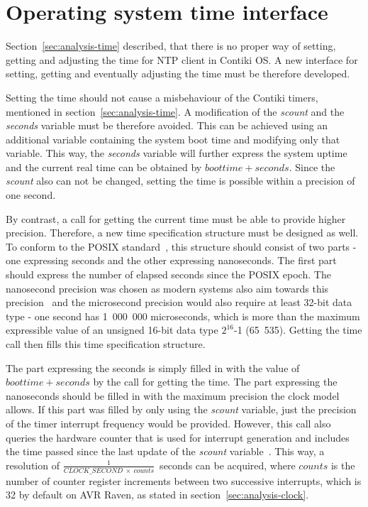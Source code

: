 
\section{Operating system time interface}\label{sec:analysis-interface}
Section~\ref{sec:analysis-time} described, that there is no proper
way of setting, getting and adjusting the time for NTP client in Contiki OS.
A new interface for setting, getting and eventually adjusting the time
must be therefore developed.

Setting the time should not cause a misbehaviour of the Contiki timers,
mentioned in section~\ref{sec:analysis-time}.
A modification of the {\it{scount}} and the {\it{seconds}} variable must be therefore avoided.
This can be achieved using an additional variable containing the system boot time
and modifying only that variable.
This way, the {\it{seconds}} variable will further express the system uptime
and the current real time can be obtained by $boottime + seconds$.
Since the {\it{scount}} also can not be changed, setting the time is possible
within a precision of one second.

By contrast, a call for getting the current time must be able to provide higher precision.
Therefore, a new time specification structure must be designed as well.
To conform to the POSIX standard~\cite{posix}, this structure should consist of two parts -
one expressing seconds and the other expressing nanoseconds.
The first part should express the number of elapsed seconds since the POSIX epoch.
The nanosecond precision was chosen as modern systems also aim towards this
precision~\cite{posix,ntp-precision} and
the microsecond precision would also require at least 32-bit data type -
one second has 1~000~000 microseconds, which is more than the maximum expressible value of
an unsigned 16-bit data type $2^{16}$-1 (65~535).
Getting the time call then fills this time specification structure.

The part expressing the seconds is simply filled in with the value of $boottime + seconds$
by the call for getting the time.
The part expressing the nanoseconds should be filled in with the maximum precision
the clock model allows.
If this part was filled by only using the {\it{scount}} variable,
just the precision of the timer interrupt frequency would be provided.
However, this call also queries the hardware counter that is used for
interrupt generation and includes the time passed since
the last update of the {\it{scount}} variable~\cite{thesis-beat}.
This way, a resolution of $\frac{1}{CLOCK\_SECOND~\times~counts}$~seconds can be acquired,
where $counts$ is the number of counter register increments between two successive interrupts,
which is 32 by default on AVR Raven, as stated in section~\ref{sec:analysis-clock}.

